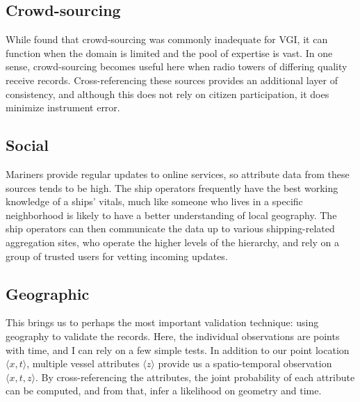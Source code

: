 \subsection{Crowd-sourcing}
While \cite{goodchildli2012} found that crowd-sourcing was commonly inadequate for VGI, it can function when the domain is limited and the pool of expertise is vast. In one sense, crowd-sourcing becomes useful here when radio towers of differing quality receive records. Cross-referencing these sources provides an additional layer of consistency, and although this does not rely on citizen participation, it does minimize instrument error.

\subsection{Social}
Mariners provide regular updates to online services, so attribute data from these sources tends to be high. The ship operators frequently have the best working knowledge of a ships' vitals, much like someone who lives in a specific neighborhood is likely to have a better understanding of local geography. The ship operators can then communicate the data up to various shipping-related aggregation sites, who operate the higher levels of the hierarchy, and rely on a group of trusted users for vetting incoming updates.

\subsection{Geographic}
This brings us to perhaps the most important validation technique: using geography to validate the records. Here, the individual observations are points with time, and I can rely on a few simple tests.  In addition to our point location $\langle x,t \rangle$, multiple vessel attributes $\langle z \rangle$ provide us a spatio-temporal observation $\langle x,t,z \rangle$. %
 By cross-referencing the attributes, the joint probability of each attribute can be computed, and from that, infer a likelihood on geometry and time. %

